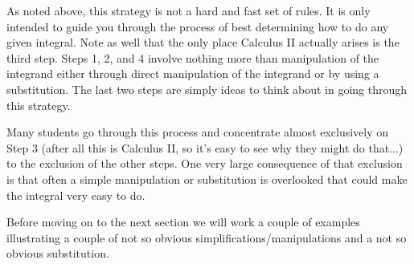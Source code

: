 As noted above, this strategy is not a hard and fast set of rules. It is only intended to guide you through the process of best determining how to do any given integral. Note as well that the only place Calculus II actually arises is the third step. Steps 1, 2, and 4 involve nothing more than manipulation of the integrand either through direct manipulation of the integrand or by using a substitution. The last two steps are simply ideas to think about in going through this strategy.

Many students go through this process and concentrate almost exclusively on Step 3 (after all this is Calculus II, so it's easy to see why they might do that...) to the exclusion of the other steps. One very large consequence of that exclusion is that often a simple manipulation or substitution is overlooked that could make the integral very easy to do.

Before moving on to the next section we will work a couple of examples illustrating a couple of not so obvious simplifications/manipulations and a not so obvious substitution.


